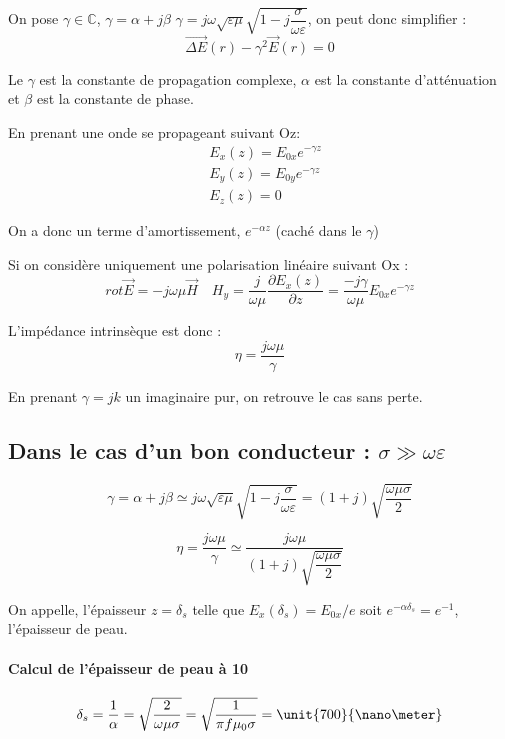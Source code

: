 \documentclass[12pt,a4paper]{report}
\newcommand{\ens}[1]{\mathbb{#1}}
\begin{document}
On pose \(\gamma \in \ens{C}\), \(\gamma = \alpha + j\beta\) \(\gamma = j\omega \sqrt{\varepsilon\mu} \sqrt{1 - j\dfrac{\sigma}{\omega \varepsilon}}\), on peut donc simplifier :
\[
	\vec{\Delta E} (r) - \gamma^2 \vec{E}(r) = 0
\]

Le \(\gamma\) est la constante de propagation complexe, \(\alpha\) est la constante d'atténuation et \(\beta\) est la constante de phase.

En prenant une onde se propageant suivant Oz:
\begin{align*}
	&E_x(z) = E_{0x} e^{-\gamma z}\\
	&E_y(z) = E_{0y}e^{-\gamma z}\\
	&E_z(z) = 0
\end{align*}

On a donc un terme d'amortissement, \(e^{-\alpha z}\) (caché dans le $\gamma$)

Si on considère uniquement une polarisation linéaire suivant Ox :
\[
	rot \vec{E} = -j \omega \mu \vec{H} \quad H_y = \dfrac{j}{\omega \mu} \dfrac{\partial E_x (z)}{\partial z} = \dfrac{-j \gamma}{\omega\mu} E_{0x}e^{-\gamma z}
\]

L'impédance intrinsèque est donc :
\[
	\eta = \dfrac{j \omega \mu}{\gamma}
\]

En prenant \(\gamma = jk\) un imaginaire pur, on retrouve le cas sans perte.

\subsection{Dans le cas d'un bon conducteur : \(\sigma \gg \omega \varepsilon\)}

\[\gamma = \alpha + j\beta \simeq j\omega \sqrt{\varepsilon\mu} \sqrt{1 - j\dfrac{\sigma}{\omega \varepsilon}} = (1 + j) \sqrt{\dfrac{\omega \mu \sigma}{2}}\]

\[
	\eta = \dfrac{j\omega \mu}{\gamma} \simeq \dfrac{j\omega \mu}{(1 + j) \sqrt{\dfrac{\omega \mu \sigma}{2}}}
\]

On appelle, l'épaisseur \(z = \delta_s\) telle que \(E_x(\delta_s) = E_{0x} / e \) soit \(e^{-\alpha \delta_s} = e^{-1}\), l'épaisseur de peau.

\paragraph{Calcul de l'épaisseur de peau à \unit{10}{\giga\hertz}}
\[
	\delta_s = \dfrac{1}{\alpha} = \sqrt{\dfrac{2}{\omega \mu \sigma}} = \sqrt{\dfrac{1}{\pi f \mu_0 \sigma}} = \unit{700}{\nano\meter}
\]
\end{document}
